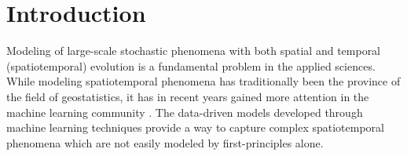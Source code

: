 \section{Introduction} \label{sec:intro}
Modeling of large-scale stochastic phenomena with both spatial and temporal (spatiotemporal) evolution is a fundamental problem in the applied sciences. %
While modeling spatiotemporal phenomena has traditionally been the province of the field of geostatistics, it has in recent years gained more attention in the machine learning community \cite{cressie2011statistics}. The data-driven models developed through machine learning techniques provide a way to capture complex spatiotemporal phenomena which are not easily modeled by first-principles alone. %

